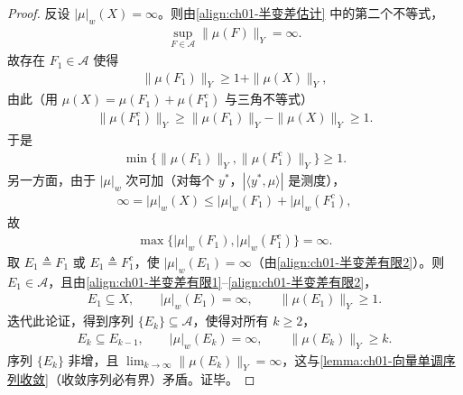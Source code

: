 \documentclass[../../main.tex]{subfiles}%
\begin{document}
\begin{proof}
反设 $|\mu|_w(X)=\infty$。则由\eqref{align:ch01-半变差估计} 中的第二个不等式，
\begin{align*}
\sup_{F\in\mathcal{A}}\|\mu(F)\|_Y=\infty.
\end{align*}
故存在 $F_1\in\mathcal{A}$ 使得
\begin{align*}
\|\mu(F_1)\|_Y\geqslant 1+\|\mu(X)\|_Y,
\end{align*}
由此（用 $\mu(X)=\mu(F_1)+\mu(F_1^c)$ 与三角不等式）
\begin{align*}
\|\mu(F_1^c)\|_Y\geqslant\|\mu(F_1)\|_Y-\|\mu(X)\|_Y\geqslant 1.
\end{align*}
于是
\begin{align}
\min\{\|\mu(F_1)\|_Y,\|\mu(F_1^c)\|_Y\}\geqslant 1. \label{align:ch01-半变差有限1}
\end{align}
另一方面，由于 $|\mu|_w$ 次可加（对每个 $y^*$，$\left|\langle y^*,\mu\rangle\right|$ 是测度），
\begin{align*}
\infty=|\mu|_w(X)\leqslant|\mu|_w(F_1)+|\mu|_w(F_1^c),
\end{align*}
故
\begin{align}
\max\{|\mu|_w(F_1),|\mu|_w(F_1^c)\}=\infty. \label{align:ch01-半变差有限2}
\end{align}
取 $E_1\triangleq F_1$ 或 $E_1\triangleq F_1^c$，使 $|\mu|_w(E_1)=\infty$（由\eqref{align:ch01-半变差有限2}）。则 $E_1\in\mathcal{A}$，且由\eqref{align:ch01-半变差有限1}--\eqref{align:ch01-半变差有限2}，
\begin{align*}
E_1\subseteq X,\qquad |\mu|_w(E_1)=\infty,\qquad\|\mu(E_1)\|_Y\geqslant 1.
\end{align*}
迭代此论证，得到序列 $\{E_k\}\subseteq\mathcal{A}$，使得对所有 $k\geqslant 2$，
\begin{align*}
E_k\subseteq E_{k-1},\qquad |\mu|_w(E_k)=\infty,\qquad\|\mu(E_k)\|_Y\geqslant k.
\end{align*}
序列 $\{E_k\}$ 非增，且 $\lim_{k\to\infty}\|\mu(E_k)\|_Y=\infty$，这与\cref{lemma:ch01-向量单调序列收敛}（收敛序列必有界）矛盾。证毕。
\end{proof}
\end{document}
